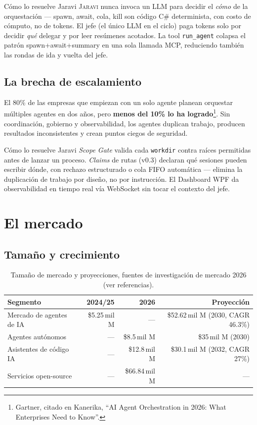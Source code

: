 \documentclass[11pt]{article}
\newcommand{\jaravi}{\textsc{Jaravi}\xspace}
\begin{document}
\begin{callout}[jaravired]{Cómo lo resuelve Jaravi}
\jaravi nunca invoca un LLM para decidir el \emph{cómo} de la orquestación --- spawn, await, cola, kill son código C\# determinista, con costo de cómputo, no de tokens. El jefe (el único LLM en el ciclo) paga tokens solo por decidir \emph{qué} delegar y por leer resúmenes acotados. La tool \texttt{run\_agent} colapsa el patrón spawn+await+summary en una sola llamada MCP, reduciendo también las rondas de ida y vuelta del jefe.
\end{callout}

\subsection{La brecha de escalamiento}
El 80\% de las empresas que empiezan con un solo agente planean orquestar múltiples agentes en dos años, pero \textbf{menos del 10\% lo ha logrado}\footnote{Gartner, citado en Kanerika, ``AI Agent Orchestration in 2026: What Enterprises Need to Know''.}. Sin coordinación, gobierno y observabilidad, los agentes duplican trabajo, producen resultados inconsistentes y crean puntos ciegos de seguridad.

\begin{callout}[jaravigreen]{Cómo lo resuelve Jaravi}
\emph{Scope Gate} valida cada \texttt{workdir} contra raíces permitidas antes de lanzar un proceso. \emph{Claims} de rutas (v0.3) declaran qué sesiones pueden escribir dónde, con rechazo estructurado o cola FIFO automática --- elimina la duplicación de trabajo por diseño, no por instrucción. El Dashboard WPF da observabilidad en tiempo real vía WebSocket sin tocar el contexto del jefe.
\end{callout}

\section{El mercado}

\subsection{Tamaño y crecimiento}
\begin{table}[h]
\centering
\small
\begin{tabularx}{\textwidth}{X r r r}
\toprule
\textbf{Segmento} & \textbf{2024/25} & \textbf{2026} & \textbf{Proyección} \\
\midrule
Mercado de agentes de IA & \$5.25\,mil M & --- & \$52.62\,mil M (2030, CAGR 46.3\%) \\
Agentes autónomos & --- & \$8.5\,mil M & \$35\,mil M (2030) \\
Asistentes de código IA & --- & \$12.8\,mil M & \$30.1\,mil M (2032, CAGR 27\%) \\
Servicios open-source & --- & \$66.84\,mil M & --- \\
\bottomrule
\end{tabularx}
\caption{Tamaño de mercado y proyecciones, fuentes de investigación de mercado 2026 (ver referencias).}
\end{table}
\end{document}
